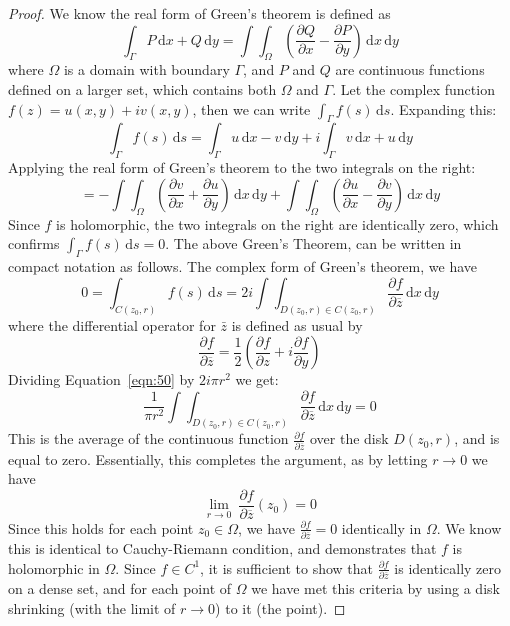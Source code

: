\documentclass{article}[12pt]
\def\D{\mathrm{d}}
\begin{document}
\begin{proof}
We know the real form of Green's theorem is defined as
\[
\int_\Gamma P\,\D x + Q\,\D y = \int \int_\Omega \left( 
\frac{\partial Q}{\partial x} - \frac{\partial P}{\partial y}
\right) \,\D x\, \D y
\]
where $\Omega$ is a domain with boundary $\Gamma$, and $P$ and
$Q$ are continuous functions defined on a larger set, which contains
both $\Omega$ and $\Gamma$.
Let the complex function $f(z)=u(x,y)+iv(x,y)$, then we can write
$\int_\Gamma f(s)\,\D s$. Expanding this:
\[
\int_\Gamma f(s)\,\D s = \int_\Gamma u\,\D x - v\,\D y + i\int_\Gamma v\,\D x + u\,\D y
\]
Applying the real form of Green's theorem to the two integrals on the right:
\[
= - \int \int_\Omega \left( 
\frac{\partial v}{\partial x} + \frac{\partial u}{\partial y}
\right) \,\D x\, \D y + \int \int_\Omega \left( 
\frac{\partial u}{\partial x} - \frac{\partial v}{\partial y}
\right) \,\D x\, \D y
\]
Since $f$ is holomorphic, the two integrals on the right are identically
zero, which confirms $\int_\Gamma f(s)\,\D s=0$.
The above Green's Theorem, can be written in compact notation as
follows.
The complex form of Green's theorem, we have
\begin{equation}
0 = \int_{C(z_0,r)} f(s)\,\D s = 2i\int\int_{D(z_0,r)\in C(z_0,r)} 
\frac{\partial f}{\partial \overline{z}} \,\D x\,\D y \label{eqn:50}
\end{equation}
where the differential operator for $\bar{z}$ is defined as usual by
\[
\frac{\partial f}{\partial \overline{z}} = \frac{1}{2}\left( 
\frac{\partial f}{\partial z}+i\frac{\partial f}{\partial y}\right)
\]
Dividing Equation~\ref{eqn:50} by $2i\pi r^2$ we get:
\begin{equation}
\frac{1}{\pi r^2} \int\int_{D(z_0,r)\in C(z_0,r)} 
\frac{\partial f}{\partial \overline{z}} \,\D x\,\D y = 0 \label{eqn:5a}
\end{equation}
This is the average of the continuous function $\frac{\partial f}{\partial \overline{z}}$ over the disk $D(z_0,r)$, and is equal to zero.
Essentially, this completes the argument, as by letting $r\to 0$ we have
\[
\lim_{r\to 0}\ \frac{\partial f}{\partial \overline{z}}(z_0)=0
\]
Since this holds for each point $z_0\in \Omega$, we have
$\frac{\partial f}{\partial \overline{z}}=0$ identically in $\Omega$.
We know this is identical to Cauchy-Riemann condition, and demonstrates
that $f$ is holomorphic in $\Omega$. Since $f\in C^1$, it is sufficient
to show that $\frac{\partial f}{\partial \overline{z}}$ is identically zero
on a dense set, and for each point of $\Omega$ we have met this criteria
by using a disk shrinking (with the limit of $r\to 0$) to it (the point).
\end{proof}
\end{document}
